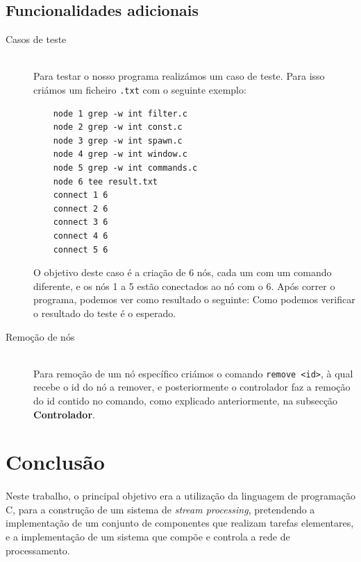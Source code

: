 \documentclass[12pt]{article}
\begin{document}
\newpage
\subsection{Funcionalidades adicionais}

\begin{description} 
\item[Casos de teste] \hfill \\
Para testar o nosso programa realizámos um caso de teste. Para isso criámos um ficheiro \texttt{.txt} com o seguinte exemplo:
\begin{verbatim}
    node 1 grep -w int filter.c
    node 2 grep -w int const.c
    node 3 grep -w int spawn.c
    node 4 grep -w int window.c
    node 5 grep -w int commands.c
    node 6 tee result.txt
    connect 1 6
    connect 2 6
    connect 3 6
    connect 4 6
    connect 5 6
\end{verbatim}
O objetivo deste caso é a criação de 6 nós, cada um com um comando diferente, e os nós 1 a 5 estão conectados ao nó com o 6. 
Após correr o programa, podemos ver como resultado o seguinte: 
Como podemos verificar o resultado do teste é o esperado.



\item[Remoção de nós] \hfill \\
Para remoção de um nó específico criámos o comando \texttt{remove <id>}, à qual recebe o id do nó a remover, e posteriormente o controlador faz a remoção do id contido no comando, como explicado anteriormente, na subsecção \textbf{Controlador}.


\end{description}

\newpage

\section{Conclusão} 
\paragraph{}
Neste trabalho, o principal objetivo era a utilização da linguagem de programação C, para a construção de um sistema de \textit{stream processing}, pretendendo a implementação de um conjunto de componentes que realizam tarefas elementares, e a implementação de um sistema que compõe e controla a rede de processamento.
\end{document}
